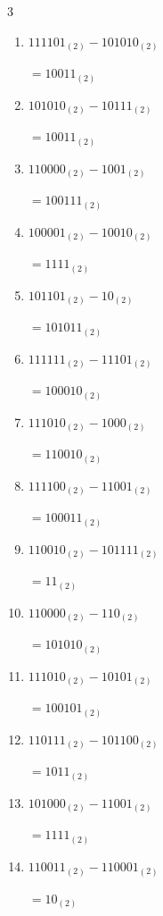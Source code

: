 \begin{multicols}{3}
\begin{enumerate}
  \item $111101_{(2)} - 101010_{(2)}$

        $=10011_{(2)}$

  \item $101010_{(2)} - 10111_{(2)}$

        $=10011_{(2)}$

  \item $110000_{(2)} - 1001_{(2)}$

        $=100111_{(2)}$

  \item $100001_{(2)} - 10010_{(2)}$

        $=1111_{(2)}$

  \item $101101_{(2)} - 10_{(2)}$

        $=101011_{(2)}$

  \item $111111_{(2)} - 11101_{(2)}$

        $=100010_{(2)}$

\columnbreak %

\resetques

  \item $111010_{(2)} - 1000_{(2)}$

        $=110010_{(2)}$

  \item $111100_{(2)} - 11001_{(2)}$

        $=100011_{(2)}$

  \item $110010_{(2)} - 101111_{(2)}$

        $=11_{(2)}$

  \item $110000_{(2)} - 110_{(2)}$

        $=101010_{(2)}$

  \item $111010_{(2)} - 10101_{(2)}$

        $=100101_{(2)}$

  \item $110111_{(2)} - 101100_{(2)}$

        $=1011_{(2)}$

  \item $101000_{(2)} - 11001_{(2)}$

        $=1111_{(2)}$

  \item $110011_{(2)} - 110001_{(2)}$

        $=10_{(2)}$


\end{enumerate}
\end{multicols}
